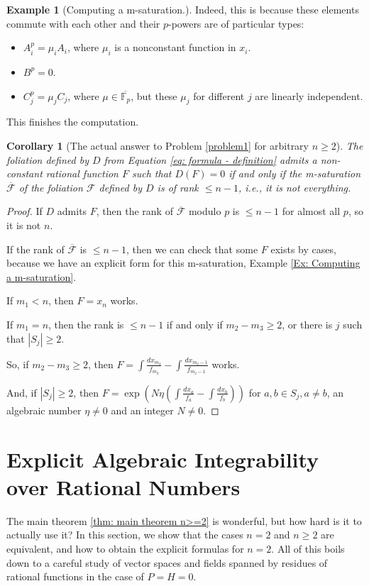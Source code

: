 \documentclass{amsart}
\newcommand{\F}{\mathcal{F}}
\newcommand{\op}{\operatorname}
\newtheorem{cor}[thm]{Corollary}
\theoremstyle{definition}
\newtheorem{example}[thm]{Example}
\begin{document}
\begin{example}[Computing a m-saturation.]
Indeed, this is because these elements commute with each other and their $p$-powers are of particular types:
\begin{itemize}
    \item $A_i^p = \mu_i A_i$, where $\mu_i$ is a nonconstant function in $x_i$.
    \item $B^p=0$.
    \item $C_j^p=\mu_j C_j$, where $\mu \in \overline{\mathbb{F}_p}$, but these $\mu_j$ for different $j$ are linearly independent.
\end{itemize}
This finishes the computation.
\end{example}

\begin{cor}[The actual answer to Problem \ref{problem1} for arbitrary $n\ge 2$]\label{cor: the actual answer}
    The foliation defined by $D$ from Equation \ref{eq: formula - definition} admits a non-constant rational function $F$ such that $D(F)=0$ if and only if the m-saturation $\overline{\F}$ of the foliation $\F$ defined by $D$ is of rank $\le n-1$, i.e., it is not everything.
\end{cor}

\begin{proof}
    If $D$ admits $F$, then the rank of $\overline{\F}$ modulo $p$ is $\le n-1$ for almost all $p$, so it is not $n$.

    If the rank of $\overline{\F}$ is $\le n-1$, then we can check that some $F$ exists by cases, because we have an explicit form for this m-saturation, Example \ref{Ex: Computing a m-saturation}.

    If $m_1<n$, then $F=x_n$ works.

    If $m_1=n$, then the rank is $\le n-1$ if and only if $m_2-m_3\ge 2$, or there is $j$ such that $|S_j|\ge 2$.
    
    So, if $m_2-m_3\ge 2$, then $F=\int \frac{dx_{m_2}}{f_{m_2}}-\int \frac{dx_{m_2-1}}{f_{m_2-1}}$ works.

    And, if $|S_j|\ge 2$, then $F=\op{exp}\left(N\eta(\int \frac{dx_{a}}{f_{a}}-\int \frac{dx_{b}}{f_{b}})\right)$ for $a,b\in S_j,a\ne b$, an algebraic number $\eta \ne 0$ and an integer $N\ne 0$.
\end{proof}


\section{Explicit Algebraic Integrability over Rational Numbers}
The main theorem \ref{thm: main theorem n>=2} is wonderful, but how hard is it to actually use it? In this section, we show that the cases $n=2$ and $n\ge 2$ are equivalent, and how to obtain the explicit formulas for $n=2$. All of this boils down to a careful study of vector spaces and fields spanned by residues of rational functions in the case of $P=H=0$.
\end{document}
